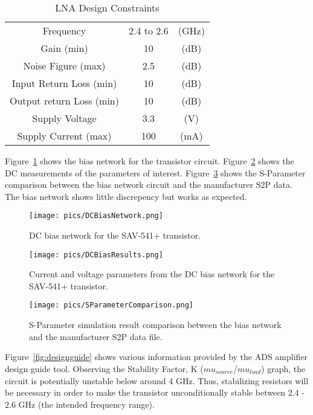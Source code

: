 \documentclass[conference]{IEEEtran}
\begin{document}
\begin{table}[!b]
\caption{LNA Design Constraints}
\centering
    \begin{tabular}{c c c}
    
  	Frequency & 2.4 to 2.6 & (GHz)\\
	Gain (min) & 10 & (dB)\\
	Noise Figure (max) & 2.5 & (dB)\\
	Input Return Loss (min) & 10 & (dB)\\
	Output return Loss (min) & 10 & (dB)\\
	Supply Voltage & 3.3 & (V)\\
	Supply Current (max) & 100 & (mA)\\
    \end{tabular}
\label{tab:specs}
\end{table}

Figure~\ref{fig:dccircuit} shows the bias network for the transistor circuit.  Figure~\ref{fig:dcvalues} shows the DC measurements of the parameters of interest.  Figure~\ref{fig:sparamresult} shows the S-Parameter comparison between the bias network circuit and the manufacturer S2P data.  The bias network shows little discrepency but works as expected.

\begin{figure}[!h]
\centering
\texttt{[image: pics/DCBiasNetwork.png]}
\caption{DC bias network for the SAV-541+ transistor.}
\label{fig:dccircuit}
\end{figure}

\begin{figure}[!h]
\centering
\texttt{[image: pics/DCBiasResults.png]}
\caption{Current and voltage  parameters from the DC bias network for the SAV-541+ transistor.}
\label{fig:dcvalues}
\end{figure}

\begin{figure}[!h]
\centering
\texttt{[image: pics/SParameterComparison.png]}
\caption{S-Parameter simulation result comparison between the bias network and the manufacturer S2P data file.}
\label{fig:sparamresult}
\end{figure}

Figure~\ref{fig:designguide} shows various information provided by the ADS amplifier design guide tool.  Observing the Stability Factor, K ($mu_{source}$/$mu_{load}$) graph, the circuit is potentially unstable below around 4 GHz.  Thus, stabilizing resistors will be necessary in order to make the transistor unconditionally stable between 2.4 - 2.6 GHz (the intended frequency range).
\end{document}

